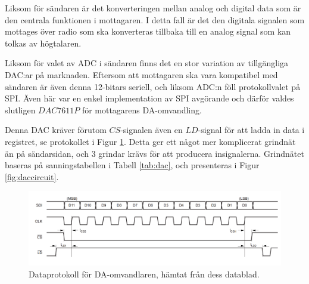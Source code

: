 \documentclass[a4paper,10pt]{article}
\begin{document}
Liksom för sändaren är det konverteringen mellan analog och digital data som
är den centrala funktionen i mottagaren. I detta fall är det den digitala 
signalen som mottages över radio som ska konverteras tillbaka till en analog
signal som kan tolkas av högtalaren.

Liksom för valet av ADC i sändaren finns det en stor variation av tillgängliga 
DAC:ar på marknaden. Eftersom att mottagaren ska vara kompatibel med sändaren
är även denna 12-bitars seriell, och liksom ADC:n föll protokollvalet på SPI. 
Även här var en enkel implementation av SPI avgörande och därför valdes 
slutligen $DAC7611P$ \cite{dac} för mottagarens DA-omvandling. 

Denna DAC kräver förutom $CS$-signalen även en $LD$-signal för att ladda in data
i registret, se protokollet i Figur \ref{fig:dacprotocol}. Detta ger ett något 
mer komplicerat grindnät än på sändarsidan, och 3 grindar krävs för att 
producera insignalerna. Grindnätet baseras på sanningstabellen i Tabell 
\ref{tab:dac}, och presenteras i Figur 
\ref{fig:daccircuit}.

\begin{figure}[h]
\centering
\includegraphics[width=\textwidth]{dacdiagram.png}
\caption{Dataprotokoll för DA-omvandlaren, hämtat från dess datablad.}
\label{fig:dacprotocol}
\end{figure}
\end{document}

